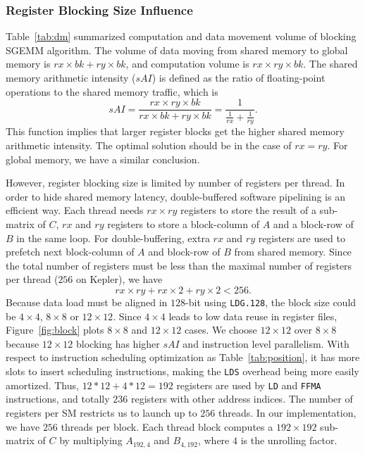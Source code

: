 \subsubsection{Register Blocking Size Influence}
Table~\ref{tab:dm} summarized computation and data movement volume of blocking SGEMM algorithm.
The volume of data moving from shared memory to global memory is $rx\times bk+ ry\times bk$, and computation volume is $rx\times ry\times bk$. 
The shared memory arithmetic intensity ($sAI$) is defined as the ratio of floating-point operations to the shared memory traffic, which is 
\begin{equation}
sAI = \frac {rx\times 
ry\times bk} {rx\times bk+ ry\times bk} = \frac{1}{\frac{1}{rx} + \frac{1}{ry}}.
\end{equation}
This function implies that larger register blocks get the higher shared memory arithmetic intensity.
The optimal solution should be in the case of $rx=ry$. %
For global memory, we have a similar conclusion.%

However, register blocking size is limited by number of registers per thread. 
In order to hide shared memory latency, double-buffered software pipelining is an efficient way. 
Each thread needs $rx\times ry$ registers to store the result of a sub-matrix of $C$, $rx$ and $ry$ registers to store a block-column of $A$ and a block-row of $B$ in the same loop. 
For double-buffering, extra $rx$ and $ry$ registers are used to prefetch next block-column of $A$ and block-row of $B$ from shared memory. 
Since the total number of registers must be less than the maximal number of registers per thread ($256$ on Kepler), we have
\begin{equation}
    rx\times ry + rx\times 2 + ry\times 2 < 256.
\label{f_register}
\end{equation}
Because data load must be aligned in $128$-bit using 
{\tt LDG.128}, the block size could be $4\times 4$, $8\times 8$ or $12\times 12$. 
Since $4\times 4$ leads to low data reuse in register files, Figure~\ref{fig:block} plots $8\times8$ and $12\times12$ cases.
We choose $12\times12$ over $8\times8$ because
$12\times12$ blocking has higher $sAI$ and instruction level parallelism. 
With respect to 
instruction scheduling optimization as Table~\ref{tab:position}, it has more slots to insert scheduling instructions,
making the {\tt LDS} overhead being more easily amortized. 
Thus, $12*12+4*12=192$ registers are used by {\tt LD} and {\tt FFMA} instructions, and totally $236$ registers with
other address indices.%
The number of registers per SM restricts us to launch up to $256$ threads. 
In our implementation, we have $256$ threads per block. 
Each thread block computes a $192\times 192$ sub-matrix of $C$ by multiplying $A_{192,4}$ and $B_{4, 192}$, where $4$ is the unrolling factor.

